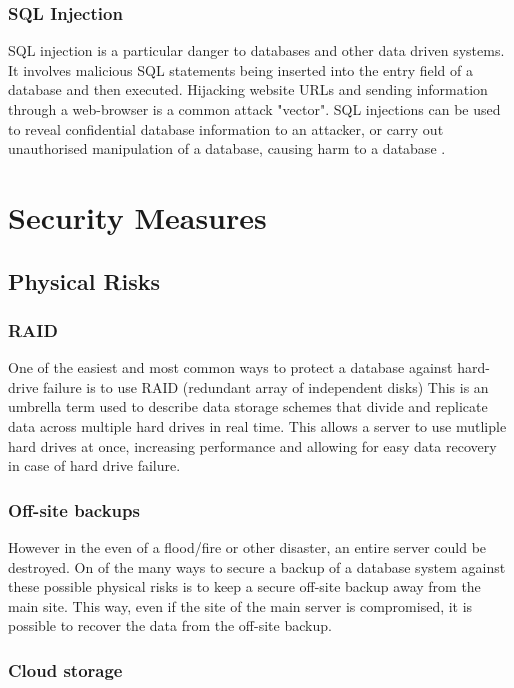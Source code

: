\documentclass[11pt]{article}
\begin{document}
\subsubsection{SQL Injection}
SQL injection is a particular danger to databases and other data driven systems.  It involves malicious SQL statements being inserted into the entry field of a database and then executed.  Hijacking website URLs and sending information through a web-browser is a common attack "vector".  SQL injections can be used to reveal confidential database information to an attacker, or carry out unauthorised manipulation of a database, causing harm to a database \cite{Bas}.

\section{Security Measures}
\subsection{Physical Risks}

\subsubsection{RAID}

One of the easiest and most common ways to protect a database against hard-drive failure is to use RAID (redundant array of independent disks)\cite{raid} This is an umbrella term used to describe data storage schemes that divide and replicate data across multiple hard drives in real time. This allows a server to use mutliple hard drives at once, increasing performance and allowing for easy data recovery in case of hard drive failure.

\subsubsection{Off-site backups}

However in the even of a flood/fire or other disaster, an entire server could be destroyed. On of the many ways to secure a backup of a database system against these possible physical risks is to keep a secure off-site backup away from the main site. This way, even if the site of the main server is compromised, it is possible to recover the data from the off-site backup.

\subsubsection{Cloud storage}
\end{document}
